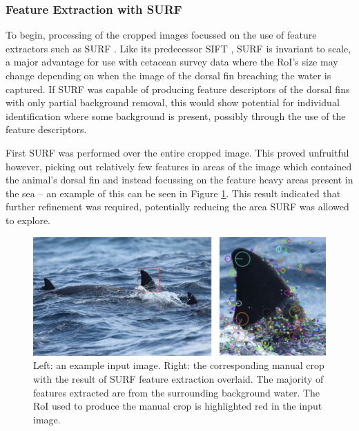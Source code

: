 \subsubsection{Feature Extraction with SURF}\label{ch:cetDet,sec:deciding,sub:boundingBoxInvestigation,subsub:SURF}

To begin, processing of the cropped images focussed on the use of feature extractors such as SURF \cite{bay_speeded-up_2008}. Like its predecessor SIFT \cite{lowe_object_1999}, SURF is invariant to scale, a major advantage for use with cetacean survey data where the RoI's size may change depending on when the image of the dorsal fin breaching the water is captured. If SURF was capable of producing feature descriptors of the dorsal fins with only partial background removal, this would show potential for individual identification where some background is present, possibly through the use of the feature descriptors.

First SURF was performed over the entire cropped image. This proved unfruitful however, picking out relatively few features in areas of the image which contained the animal's dorsal fin and instead focussing on the feature heavy areas present in the sea -- an example of this can be seen in Figure \ref{fig:manual-crop-surf-example}. This result indicated that further refinement was required, potentially reducing the area SURF was allowed to explore.

\begin{figure}
	\begin{center}
		\includegraphics[scale=0.6]{Chapter3/figs/manual-crop-surf-updated.png}
	\end{center}
	\caption[Left: an example input image. Right: the corresponding manual crop with the result of SURF feature extraction overlaid.]{Left: an example input image. Right: the corresponding manual crop with the result of SURF feature extraction overlaid. The majority of features extracted are from the surrounding background water. The RoI used to produce the manual crop is highlighted red in the input image.}
	\label{fig:manual-crop-surf-example}
\end{figure}

